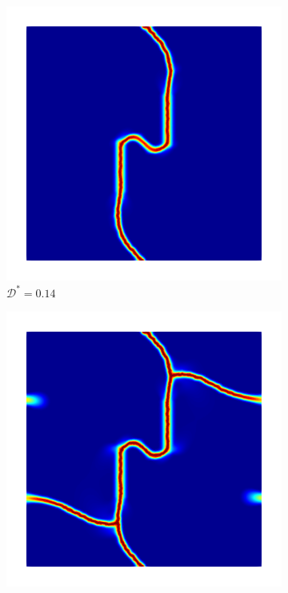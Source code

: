 
\begin{figure}[htb!]
  \centering
  \begin{subfigure}[b]{0.23\textwidth}
    \centering
    \includegraphics[width=\textwidth,scale=0.5]{Chapter4/figures/biaxial_nosplit_1.png}
    \caption{$\mathcal{D}^* = 0.14$}
    \label{fig: Chapter4/biaxial_nosplit_1}
  \end{subfigure}
  \hspace{0.03\textwidth}
  \begin{subfigure}[b]{0.23\textwidth}
    \centering
    \includegraphics[width=\textwidth,scale=0.5]{Chapter4/figures/biaxial_nosplit_2.png}

\end{subfigure}
\end{figure}
